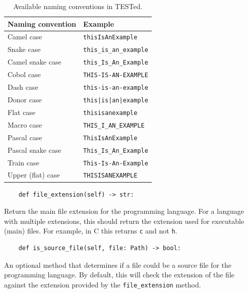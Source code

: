 \documentclass[../main]{subfiles}
\begin{document}
\begin{table}[h]
    \centering
    \caption{Available naming conventions in TESTed.}
    \label{tab:naming-conventions}
    \begin{tabular}{|l|l|}
        \hline
        Naming convention & Example \\
        \hline
        Camel case & \texttt{thisIsAnExample}  \\
        Snake case & \texttt{this\_is\_an\_example} \\
        Camel snake case & \texttt{this\_Is\_An\_Example} \\
        Cobol case & \texttt{THIS-IS-AN-EXAMPLE} \\
        Dash case & \texttt{this-is-an-example} \\
        Donor case & \texttt{this|is|an|example} \\
        Flat case & \texttt{thisisanexample} \\
        Macro case & \texttt{THIS\_I\_AN\_EXAMPLE} \\
        Pascal case & \texttt{ThisIsAnExample} \\
        Pascal snake case & \texttt{This\_Is\_An\_Example} \\
        Train case & \texttt{This-Is-An-Example} \\
        Upper (flat) case & \texttt{THISISANEXAMPLE} \\
        \hline
    \end{tabular}
\end{table}

\begin{verbatim}
    def file_extension(self) -> str:
\end{verbatim}

Return the main file extension for the programming language.
For a language with multiple extensions, this should return the extension used for executable (main) files.
For example, in C this returns \texttt{c} and not \texttt{h}.

\begin{verbatim}
    def is_source_file(self, file: Path) -> bool:
\end{verbatim}

An optional method that determines if a file could be a source file for the programming language.
By default, this will check the extension of the file against the extension provided by the \texttt{file_extension} method.
\end{document}
